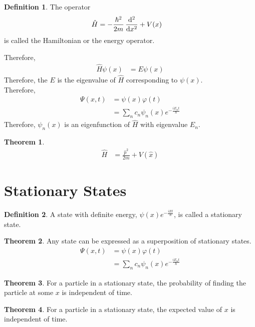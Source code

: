 \documentclass[titlepage, fleqn, a4paper, 12pt, twoside]{article}
\theoremstyle{definition}
\newtheorem{definition}{Definition}
\theoremstyle{theorem}
\newtheorem{theorem}{Theorem}
\begin{document}
\begin{definition}
	The operator
	\begin{align*}
		\hat{H} &= -\frac{\hbar^2}{2 m} \dod[2]{}{x} + V(x)
	\end{align*}
	is called the Hamiltonian or the energy operator.
\end{definition}
Therefore,
\begin{align*}
	\hat{H} \psi(x) &= E \psi(x)
\end{align*}
Therefore, the $E$ is the eigenvalue of $\hat{H}$ corresponding to $\psi(x)$.\\
Therefore,
\begin{align*}
	\Psi(x,t) &= \psi(x) \varphi(t)\\
	&= \sum\limits_{n} c_n \psi_n(x) e^{-\frac{i E_n t}{\hbar}}
\end{align*}
Therefore, $\psi_n(x)$ is an eigenfunction of $\hat{H}$ with eigenvalue $E_n$.

\begin{theorem}
	\begin{align*}
		\hat{H} &= \frac{\hat{p}^2}{2 m} + V\left( \hat{x} \right)
	\end{align*}
\end{theorem}

\section{Stationary States}

\begin{definition}
	A state with definite energy, $\psi(x) e^{-\frac{i E t}{\hbar}}$, is called a stationary state.
\end{definition}

\begin{theorem}
	Any state can be expressed as a superposition of stationary states.
	\begin{align*}
		\Psi(x,t) &= \psi(x) \varphi(t)\\
		&= \sum\limits_{n} c_n \psi_n(x) e^{-\frac{i E_n t}{\hbar}}
	\end{align*}
\end{theorem}

\begin{theorem}
	For a particle in a stationary state, the probability of finding the particle at some $x$ is independent of time.
\end{theorem}

\begin{theorem}
	For a particle in a stationary state, the expected value of $x$ is independent of time.
\end{theorem}
\end{document}
